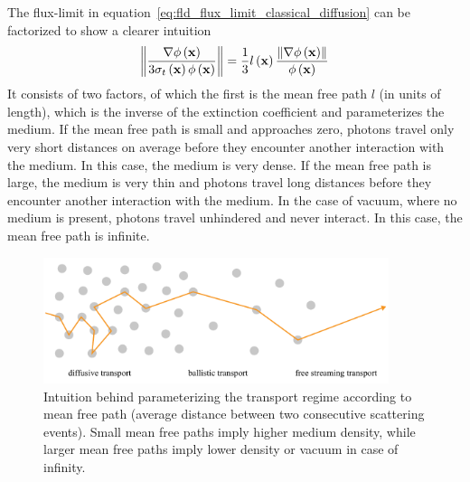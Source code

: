 The flux-limit in equation~\ref{eq:fld_flux_limit_classical_diffusion} can be factorized to show a clearer intuition
\begin{align}
\label{eq:flux_limit_factors}
\left\lVert
\frac{\nabla\phi\left(\boldsymbol{\mathbf{x}}\right)}{3\sigma_t\left(\boldsymbol{\mathbf{x}}\right)\phi\left(\boldsymbol{\mathbf{x}}\right)}
\right\rVert
=
\frac{1}{3}
l\left(\boldsymbol{\mathbf{x}}\right)
\frac{\left\lVert\nabla\phi\left(\boldsymbol{\mathbf{x}}\right)\right\rVert}{\phi\left(\boldsymbol{\mathbf{x}}\right)}
\end{align}
It consists of two factors, of which the first is the mean free path $l$ (in units of length), which is the inverse of the extinction coefficient and parameterizes the medium. If the mean free path is small and approaches zero, photons travel only very short distances on average before they encounter another interaction with the medium. In this case, the medium is very dense. If the mean free path is large, the medium is very thin and photons travel long distances before they encounter another interaction with the medium. In the case of vacuum, where no medium is present, photons travel unhindered and never interact. In this case, the mean free path is infinite.
\begin{figure}[h]
\centering
\includegraphics[width=0.9\textwidth]{06_fld/figures/fig_transport_regimes_mfp.pdf}
\caption{Intuition behind parameterizing the transport regime according to mean free path (average distance between two consecutive scattering events). Small mean free paths imply higher medium density, while larger mean free paths imply lower density or vacuum in case of infinity.}
\label{fig:fld_transport_regimes_mfp}
\end{figure}




